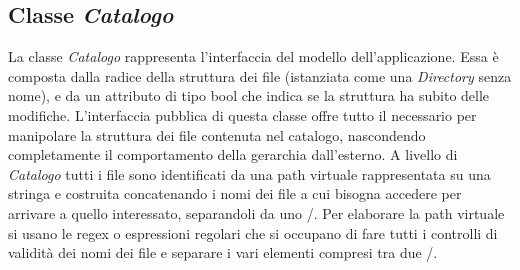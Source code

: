 \subsection{Classe \emph{Catalogo}}

La classe \emph{Catalogo} rappresenta l'interfaccia del modello dell'applicazione.
Essa è composta dalla radice della struttura dei file (istanziata come una \emph{Directory} senza nome), 
e da un attributo di tipo bool che indica se la struttura ha subito delle modifiche.
L'interfaccia pubblica di questa classe offre tutto il necessario per manipolare la struttura dei file
contenuta nel catalogo, nascondendo completamente il comportamento della gerarchia dall'esterno.
A livello di \emph{Catalogo} tutti i file sono identificati da una path virtuale rappresentata su una stringa
e costruita concatenando i nomi dei file a cui bisogna accedere per arrivare a quello interessato, separandoli da uno /.
Per elaborare la path virtuale si usano le regex o espressioni regolari che si occupano di fare tutti i controlli di validità dei nomi dei file e separare i vari elementi compresi tra due /.
